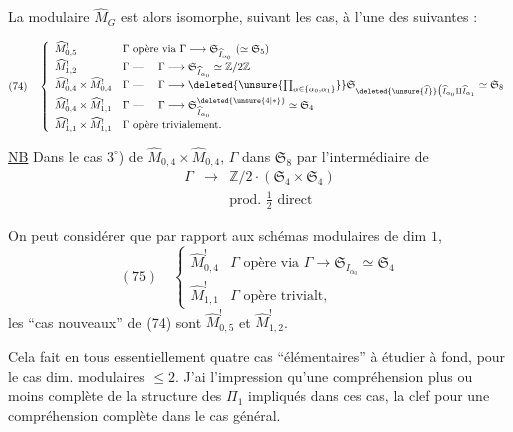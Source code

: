 La   modulaire $\widehat M_G$ est alors isomorphe, suivant les cas, à l'une des suivantes :

\[
(74)\quad\left\{\begin{array}{ll}
\widehat M^!_{0,5}&\Gamma\text{ opère via }\Gamma\longrightarrow\mathfrak S_{\widehat I_{\alpha_0}}\ (\simeq\mathfrak S_5)\\
\widehat M^!_{1,2}&\Gamma\text{ --- }\quad\Gamma\longrightarrow\mathfrak S_{\widehat I_{\alpha_0}}\simeq\mathbb Z/2\mathbb Z\\
\widehat M^!_{0,4}\times\widehat M^!_{0,4}&\Gamma\text{ --- }\quad\Gamma\longrightarrow\deleted{\unsure{\prod_{\alpha\in\{\alpha_0,\alpha_1\}}}}\mathfrak S_{\deleted{\unsure{\widehat I}}\bigl(\widehat I_{\alpha_0}\amalg\widehat I_{\alpha_1}}\simeq\mathfrak S_8\\
\widehat M^!_{0,4}\times\widehat M^!_{1,1}&\Gamma\text{ --- }\quad\Gamma\longrightarrow\mathfrak S^{\deleted{\unsure{4|*}}}_{\widehat I_{\alpha_0}}\simeq\mathfrak S_4\\
\widehat M^!_{1,1}\times\widehat M^!_{1,1}&\Gamma\text{ opère trivialement.}
\end{array}\right.
\]

\uline{NB}  Dans le cas $3^\circ$) de $\widehat M_{0,4}\times\widehat M_{0,4}$, $\Gamma$  dans $\mathfrak S_8$ par l'intermédiaire de
\[
\begin{array}{rcl}
\Gamma&\longrightarrow&\mathbb Z/2\mathbin{\cdot}(\mathfrak S_4\times\mathfrak S_4)\\
&&\text{prod. }\frac12\text{ direct}
\end{array}
\]

On peut considérer que par rapport aux schémas modulaires  de dim $1$, 
\[
(75)\quad\left\{\begin{array}{ll}
\widehat M^!_{0,4}&\Gamma\text{ opère via }\Gamma\longrightarrow\mathfrak S_{I_{\alpha_0}}\simeq\mathfrak S_4\\
\widehat M^!_{1,1}&\Gamma\text{ opère trivialt},
\end{array}\right.
\]
les ``cas nouveaux'' de (74) sont $\widehat M^!_{0,5}$ et $\widehat M^!_{1,2}$.

Cela fait en tous essentiellement quatre cas ``élémentaires'' à étudier à fond, pour le cas  dim. modulaires $\leq2$. J'ai l'impression qu'une compréhension plus ou moins complète de la structure des $\Pi_1$  impliqués dans ces cas,  la clef pour une compréhension complète dans le cas général.

